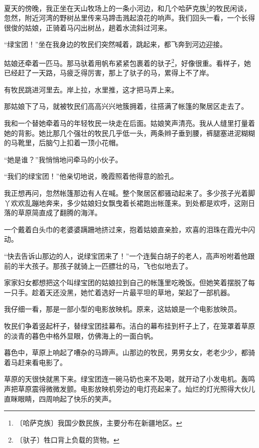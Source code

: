 \documentclass[12pt,UTF-8,openany]{ctexbook}
\begin{document}
\begin{Large}
    
    夏天的傍晚，我正坐在天山牧场上的一条小河边，和几个哈萨克族\footnote{〔哈萨克族〕我国少数民族，主要分布在新疆地区。}的牧民闲谈，忽然，附近河湾的野树丛里传来马蹄击溅起浪花的响声。我们回头一看，一个长得很俊的姑娘，正骑着马闪出树丛，趟着水流斜过河来。
    
    “绿宝团！”坐在我身边的牧民们突然喊着，跳起来，都飞奔到河边迎接。
    
    姑娘还牵着一匹马。那马驮着用帆布紧紧包裹着的驮子\footnote{〔驮子〕牲口背上负载的货物。}，好像很重。看样子，她已经赶了一天路，马疲乏得厉害，那上了驮子的马，累得上不了岸。
    
    有牧民跳进河里去。岸上拉，水里推，这才把马弄上来。
    
    那姑娘下了马，就被牧民们高高兴兴地簇拥着，往搭满了帐篷的聚居区走去了。
    
    我和一个替她牵着马的年轻牧民一块走在后面。姑娘笑声清亮。我从人缝里打量着她的背影。她比那几个强壮的牧民几乎低一头，两条辫子垂到腰，裤腿塞进泥糊糊的马靴里，后脑勺上扣着一顶小花帽。
    
    “她是谁？”我悄悄地问牵马的小伙子。
    
    “我们的绿宝团！”他亲切地说，晚霞照着他得意的脸孔。
    
    我正想再问，忽然帐篷那边有人在喊。整个聚居区都骚动起来了。多少孩子光着脚丫欢欢乱蹦地奔来，多少姑娘妇女飘曳着长裙跑出帐蓬来。到处都是欢呼，这刚日落的草原简直成了翻腾的海洋。
    
    一个戴着白头巾的老婆婆蹒跚地挤过来，抱着姑娘直亲脸，欢喜的泪珠在霞光中闪动。
    
    “快去告诉山那边的人，说绿宝团来了！”一个连鬓白胡子的老人，高声吩咐着他跟前的半大孩子。那孩子就骑上一匹膘壮的马，飞也似地去了。
    
    家家妇女都想把这个叫绿宝团的姑娘拉到自己的帐篷里吃晚饭。但她笑着摆脱了每一只手。趁着天还没黑，她忙着选好一片最平坦的草地，架起了一部机器。
    
    我仔细一看，那是一部小型的电影放映机。原来，这姑娘是一个电影放映员。
    
    牧民们争着竖起杆子，替绿宝团挂幕布。洁白的幕布挂到杆子上了，在笼罩着草原的淡青的暮色中格外显眼，仿佛海上的一面白帆。
    
    暮色中，草原上响起了嘈杂的马蹄声。山那边的牧民，男男女女，老老少少，都骑着马赶来看电影了。
    
    草原的天很快就黑下来。绿宝团连一碗马奶也来不及喝，就开动了小发电机。轰鸣声把草原震得微微发颤。电影放映机旁边的电灯亮起来了。灿烂的灯光照得大伙儿直眯眼睛，四周响起了快乐的笑声。
    

\end{Large}
\end{document}
